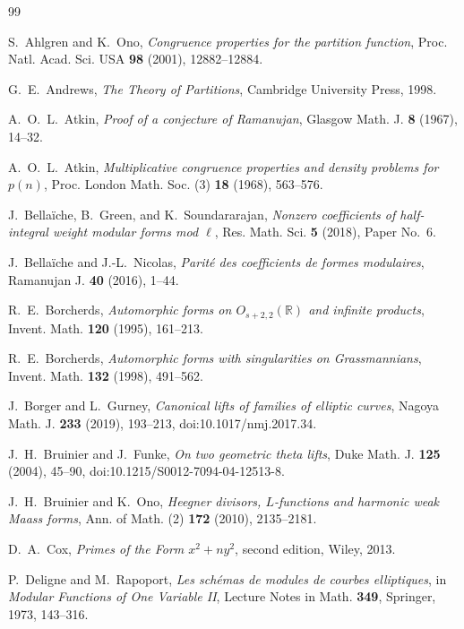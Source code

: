 \documentclass[11pt]{amsart}
\theoremstyle{remark}
\numberwithin{equation}{section}
\begin{document}
\begin{thebibliography}{99}

S.~Ahlgren and K.~Ono,
\emph{Congruence properties for the partition function},
Proc. Natl. Acad. Sci. USA \textbf{98} (2001), 12882--12884.

G.~E.~Andrews,
\emph{The Theory of Partitions}, Cambridge University Press, 1998.

A.~O.~L.~Atkin,
\emph{Proof of a conjecture of Ramanujan},
Glasgow Math. J. \textbf{8} (1967), 14--32.

A.~O.~L.~Atkin,
\emph{Multiplicative congruence properties and density problems for $p(n)$},
Proc. London Math. Soc. (3) \textbf{18} (1968), 563--576.

J.~Bella\"iche, B.~Green, and K.~Soundararajan,
\emph{Nonzero coefficients of half-integral weight modular forms mod $\ell$},
Res. Math. Sci. \textbf{5} (2018), Paper No.~6.

J.~Bella\"iche and J.-L.~Nicolas,
\emph{Parit\'e des coefficients de formes modulaires},
Ramanujan J. \textbf{40} (2016), 1--44.

R.~E.~Borcherds,
\emph{Automorphic forms on $O_{s+2,2}(\mathbb R)$ and infinite products},
Invent. Math. \textbf{120} (1995), 161--213.

R.~E.~Borcherds,
\emph{Automorphic forms with singularities on Grassmannians},
Invent. Math. \textbf{132} (1998), 491--562.

J.~Borger and L.~Gurney,
\emph{Canonical lifts of families of elliptic curves},
Nagoya Math. J. \textbf{233} (2019), 193--213,
doi:10.1017/nmj.2017.34.

J.~H.~Bruinier and J.~Funke,
\emph{On two geometric theta lifts},
Duke Math. J. \textbf{125} (2004), 45--90,
doi:10.1215/S0012-7094-04-12513-8.

J.~H.~Bruinier and K.~Ono,
\emph{Heegner divisors, $L$-functions and harmonic weak Maass forms},
Ann. of Math. (2) \textbf{172} (2010), 2135--2181.

D.~A.~Cox,
\emph{Primes of the Form $x^2+ny^2$}, second edition,
Wiley, 2013.

P.~Deligne and M.~Rapoport,
\emph{Les sch\'emas de modules de courbes elliptiques},
in \emph{Modular Functions of One Variable II}, Lecture Notes in Math.
\textbf{349}, Springer, 1973, 143--316.


\end{thebibliography}
\end{document}
